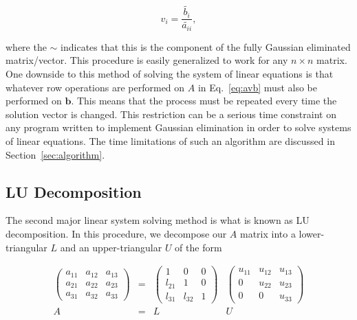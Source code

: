 \documentclass[12pt]{article}
\numberwithin{equation}{section}
\begin{document}
\begin{equation}
v_{i} = \frac{\widetilde{b_{i}}}{\widetilde{a_{ii}}},
\end{equation}

\noindent where the $\sim$ indicates that this is the component of the fully Gaussian eliminated matrix/vector.  This procedure is easily generalized to work for any $n\times n$ matrix.
\\\indent One downside to this method of solving the system of linear equations is that whatever row operations are performed on $A$ in Eq.~\ref{eq:avb} must also be performed on $\textbf{b}$.  This means that the process must be repeated every time the solution vector is changed.  This restriction can be a serious time constraint on any program written to implement Gaussian elimination in order to solve systems of linear equations.  The time limitations of such an algorithm are discussed in Section~\ref{sec:algorithm}.

\subsection{LU Decomposition}
\label{subsec:ludecomp}

The second major linear system solving method is what is known as LU decomposition.  In this procedure, we decompose our $A$ matrix into a lower-triangular $L$ and an upper-triangular $U$ of the form

\begin{equation}
\label{eq:ludecomp1}
\begin{array}{cccc}
\left(
\begin{array}{ccc}
a_{11} & a_{12} & a_{13} \\
a_{21} & a_{22} & a_{23} \\
a_{31} & a_{32} & a_{33}
\end{array}
\right) &=&
\left(
\begin{array}{ccc}
1 & 0 & 0 \\
l_{21} & 1 & 0 \\
l_{31} & l_{32} & 1
\end{array}\right)&
\left(\begin{array}{ccc}
u_{11} & u_{12} & u_{13} \\
0 & u_{22} & u_{23} \\
0 & 0 & u_{33}
\end{array}\right) \\
A &=& L&U
\end{array}
\end{equation}
\end{document}

